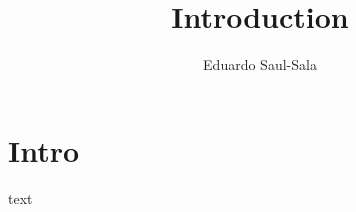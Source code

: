 \documentclass{article}
\title{Introduction}
\author{Eduardo Saul-Sala}
\date{}
\begin{document}
\maketitle


\section{Intro}

text
\end{document}
